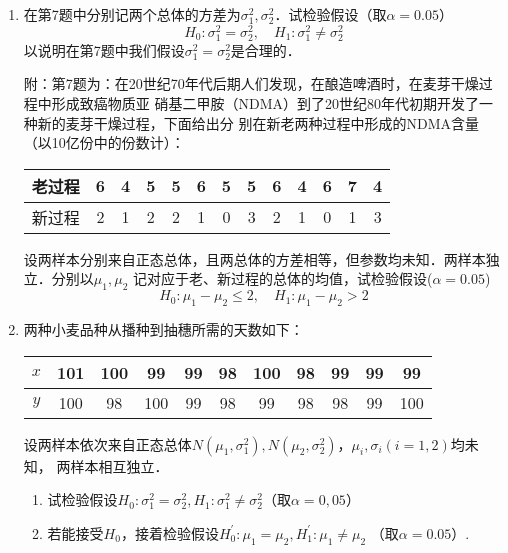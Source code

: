\documentclass[10pt,a4paper]{article}
\begin{document}
\begin{enumerate}
    \item 在第7题中分别记两个总体的方差为$\sigma_1^2,\sigma_2^2$．试检验假设（取$\alpha=0.05$）
    $$H_0:\sigma_1^2=\sigma_2^2, \quad H_1:\sigma_1^2\neq \sigma^2_2$$
    以说明在第7题中我们假设$\sigma_1^2=\sigma_2^2$是合理的．
    
    {\kaishu 附：第7题为：在20世纪70年代后期人们发现，在酿造啤酒时，在麦芽干燥过程中形成致癌物质亚
    硝基二甲胺（NDMA）到了20世纪80年代初期开发了一种新的麦芽干燥过程，下面给出分
    别在新老两种过程中形成的NDMA含量（以10亿份中的份数计）：
    \renewcommand{\arraystretch}{1.3}
    \begin{table}[H]\centering
    \begin{tabular}{c|cccccccccccc}
    老过程 & 6 & 4 & 5 & 5 & 6 & 5 & 5 & 6 & 4 & 6 & 7 & 4 \\ \hline
    新过程 & 2 & 1 & 2 & 2 & 1 & 0 & 3 & 2 & 1 & 0 & 1 & 3
    \end{tabular}
    \end{table}
    \renewcommand{\arraystretch}{1.0}
    设两样本分别来自正态总体，且两总体的方差相等，但参数均未知．两样本独立．分别以$\mu_1,\mu_2$
    记对应于老、新过程的总体的均值，试检验假设($\alpha=0.05$)
    $$H_0:\mu_1-\mu_2\leq 2,\quad H_1:\mu_1-\mu_2>2$$}
    \clearpage



    \item 两种小麦品种从播种到抽穗所需的天数如下：
    \renewcommand{\arraystretch}{1.3}   
    \begin{table}[H]\centering
        \begin{tabular}{c|cccccccccc}
        $x$ & 101 & 100 & 99  & 99 & 98 & 100 & 98 & 99 & 99 & 99  \\ \hline
        $y$ & 100 & 98  & 100 & 99 & 98 & 99  & 98 & 98 & 99 & 100
        \end{tabular}
    \end{table}
    \renewcommand{\arraystretch}{1.0}
    设两样本依次来自正态总体$N(\mu_1,\sigma_1^2),N(\mu_2,\sigma_2^2)$，$\mu_i,\sigma_i(i=1,2)$均未知，
    两样本相互独立．
    \begin{enumerate}
        \item 试检验假设$H_0:\sigma_1^2=\sigma_2^2,H_1:\sigma_1^2\neq \sigma_2^2$（取$\alpha=0,05$）
        \item 若能接受$H_0$，接着检验假设$H^\prime_0:\mu_1=\mu_2,H^\prime_1:\mu_1\neq \mu_2$ （取$\alpha=0.05$）.
    \end{enumerate}
    \clearpage




\end{enumerate}
\end{document}
